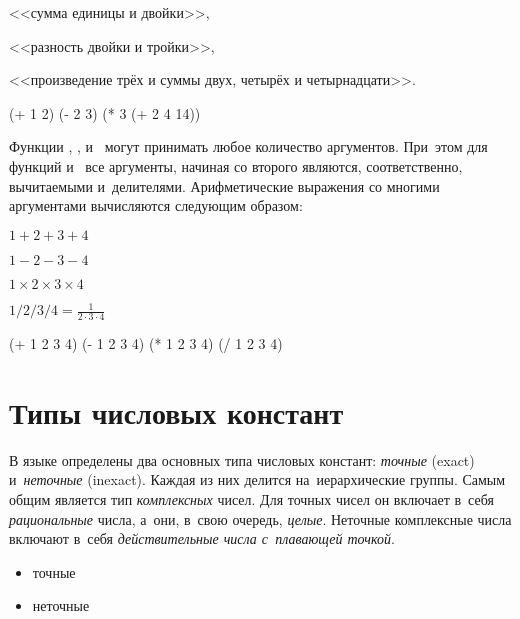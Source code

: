 \begin{example}{%
<<сумма единицы и двойки>>,

<<разность двойки и тройки>>,

<<произведение трёх и суммы двух, четырёх и четырнадцати>>.}
\begin{ExampleCode}
(+ 1 2)
(- 2 3)
(* 3 (+ 2 4 14))
\end{ExampleCode}
\end{example}

Функции \s{+}, \s{*}, \s{-} и~\s{/} могут принимать любое количество аргументов. При~этом для функций \s{-} и~\s{/} все аргументы, начиная со второго являются, соответственно, вычитаемыми и~делителями. Арифметические выражения со многими аргументами вычисляются следующим образом:

\begin{example}{%
$1+2+3+4$

$1-2-3-4$

$1\times2\times3\times4$

$1/2/3/4 = \frac{1}{2\cdot3\cdot4}$}
\begin{ExampleCode}
(+ 1 2 3 4)
(- 1 2 3 4)
(* 1 2 3 4)
(/ 1 2 3 4)
\end{ExampleCode}
\end{example}


\section{Типы числовых констант}%
В языке \Scheme определены два основных типа числовых констант: \emph{точные} (exact) и~\emph{неточные} (inexact). Каждая из них делится на~иерархические группы. Самым общим является тип \emph{комплексных} чисел. Для точных чисел он включает в~себя \emph{рациональные} числа, а~они, в~свою очередь, \emph{целые}. Неточные комплексные числа включают в~себя \emph{действительные числа с~плавающей точкой}.

\begin{itemize}[--]
  \item точные
  \item неточные
\end{itemize}

